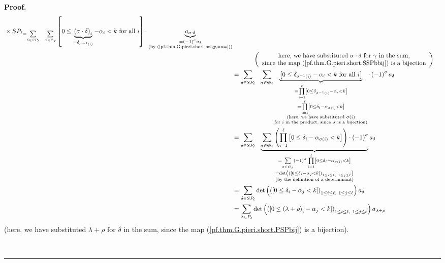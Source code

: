 \documentclass[numbers=enddot,12pt,final,onecolumn,notitlepage]{scrartcl}%
\theoremstyle{definition}
\newenvironment{proof}[1][Proof]{\noindent\textbf{#1.} }{\ \rule{0.5em}{0.5em}}
\let\sumnonlimits\sum
\let\prodnonlimits\prod
\renewcommand{\sum}{\sumnonlimits\limits}
\renewcommand{\prod}{\prodnonlimits\limits}
\newenvironment{vershort}{}{}
\begin{document}
\begin{vershort}
\begin{proof}
\begin{align}
{{{}\times SP_{\ell}}}_{=\sum_{\delta\in SP_{\ell}}\ \ \sum_{\sigma
\in\mathfrak{S}_{\ell}}}\left[  0\leq\underbrace{\left(  \sigma\cdot
\delta\right)  _{i}}_{=\delta_{\sigma^{-1}\left(  i\right)  }}-\alpha
_{i}<k\text{ for all }i\right]  \cdot\underbrace{a_{\sigma\cdot\delta}%
}_{\substack{=\left(  -1\right)  ^{\sigma}a_{\delta}\\\text{(by
(\ref{pf.thm.G.pieri.short.asiggam=}))}}}\nonumber\\
&  \ \ \ \ \ \ \ \ \ \ \left(
\begin{array}
[c]{c}%
\text{here, we have substituted }\sigma\cdot\delta\text{ for }\gamma\text{ in
the sum,}\\
\text{since the map (\ref{pf.thm.G.pieri.short.SSPbbij}) is a bijection}%
\end{array}
\right) \nonumber\\
&  =\sum_{\delta\in SP_{\ell}}\ \ \sum_{\sigma\in\mathfrak{S}_{\ell}%
}\underbrace{\left[  0\leq\delta_{\sigma^{-1}\left(  i\right)  }-\alpha
_{i}<k\text{ for all }i\right]  }_{\substack{=\prod_{i=1}^{\ell}\left[
0\leq\delta_{\sigma^{-1}\left(  i\right)  }-\alpha_{i}<k\right]
\\=\prod_{i=1}^{\ell}\left[  0\leq\delta_{i}-\alpha_{\sigma\left(  i\right)
}<k\right]  \\\text{(here, we have substituted }\sigma\left(  i\right)
\\\text{for }i\text{ in the product, since }\sigma\text{ is a bijection)}%
}}\cdot\left(  -1\right)  ^{\sigma}a_{\delta}\nonumber\\
&  =\sum_{\delta\in SP_{\ell}}\ \ \underbrace{\sum_{\sigma\in\mathfrak{S}%
_{\ell}}\left(  \prod_{i=1}^{\ell}\left[  0\leq\delta_{i}-\alpha
_{\sigma\left(  i\right)  }<k\right]  \right)  \cdot\left(  -1\right)
^{\sigma}}_{\substack{=\sum_{\sigma\in\mathfrak{S}_{\ell}}\left(  -1\right)
^{\sigma}\prod_{i=1}^{\ell}\left[  0\leq\delta_{i}-\alpha_{\sigma\left(
i\right)  }<k\right]  \\=\det\left(  \left(  \left[  0\leq\delta_{i}%
-\alpha_{j}<k\right]  \right)  _{1\leq i\leq\ell,\ 1\leq j\leq\ell}\right)
\\\text{(by the definition of a determinant)}}}a_{\delta}\nonumber\\
&  =\sum_{\delta\in SP_{\ell}}\det\left(  \left(  \left[  0\leq\delta
_{i}-\alpha_{j}<k\right]  \right)  _{1\leq i\leq\ell,\ 1\leq j\leq\ell
}\right)  a_{\delta}\nonumber\\
&  =\sum_{\lambda\in P_{\ell}}\det\left(  \left(  \left[  0\leq\left(
\lambda+\rho\right)  _{i}-\alpha_{j}<k\right]  \right)  _{1\leq i\leq
\ell,\ 1\leq j\leq\ell}\right)  a_{\lambda+\rho}
\label{pf.thm.G.pieri.short.prod2}%
\end{align}
(here, we have substituted $\lambda+\rho$ for $\delta$ in the sum, since the
map (\ref{pf.thm.G.pieri.short.PSPbij}) is a bijection).


\end{proof}
\end{vershort}
\end{document}
